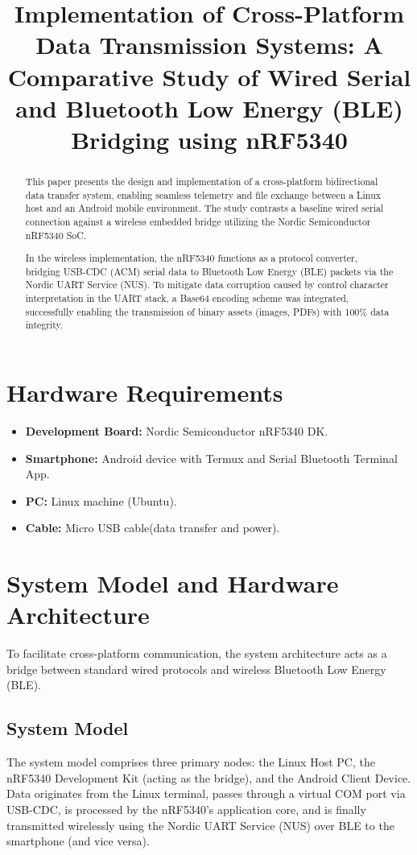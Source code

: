 \documentclass[conference]{IEEEtran}
\title{Implementation of Cross-Platform Data Transmission Systems: A Comparative Study of Wired Serial and Bluetooth Low Energy (BLE) Bridging using nRF5340}
\author{
\IEEEauthorblockN{Bhargav K, Harsha B J}
\IEEEauthorblockA{
Department of Electrical Engineering\\
IIT Hyderabad\\
Email: ee25btech11013@iith.ac.in, ee25btech11026@iith.ac.in}
}
\begin{document}
\maketitle
\begin{abstract}
This paper presents the design and implementation of a cross-platform bidirectional data transfer system, enabling seamless telemetry and file exchange between a Linux host and an Android mobile environment. The study contrasts a baseline wired serial connection against a wireless embedded bridge utilizing the Nordic Semiconductor nRF5340 SoC.

In the wireless implementation, the nRF5340 functions as a protocol converter, bridging USB-CDC (ACM) serial data to Bluetooth Low Energy (BLE) packets via the Nordic UART Service (NUS). To mitigate data corruption caused by control character interpretation in the UART stack, a Base64 encoding scheme was integrated, successfully enabling the transmission of binary assets (images, PDFs) with 100\% data integrity.
\end{abstract}

\section{Hardware Requirements}
\begin{itemize}
    \item \textbf{Development Board:} Nordic Semiconductor nRF5340 DK.
    \item \textbf{Smartphone:} Android device with Termux and Serial Bluetooth Terminal App.
    \item \textbf{PC:} Linux machine (Ubuntu).
    \item \textbf{Cable:} Micro USB cable(data transfer and power).
\end{itemize}

\section{System Model and Hardware Architecture}

To facilitate cross-platform communication, the system architecture acts as a bridge between standard wired protocols and wireless Bluetooth Low Energy (BLE). 

\subsection{System Model}
The system model comprises three primary nodes: the Linux Host PC, the nRF5340 Development Kit (acting as the bridge), and the Android Client Device. Data originates from the Linux terminal, passes through a virtual COM port via USB-CDC, is processed by the nRF5340's application core, and is finally transmitted wirelessly using the Nordic UART Service (NUS) over BLE to the smartphone (and vice versa).
\end{document}
